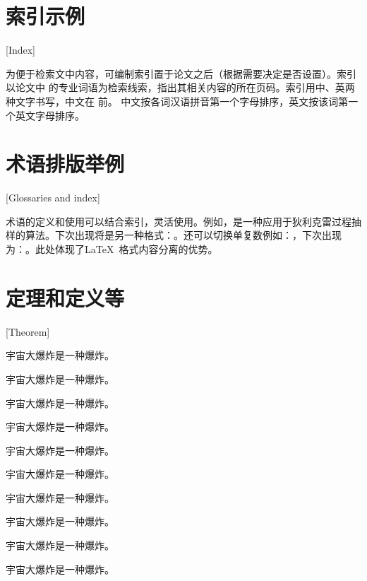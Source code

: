 \section{索引示例}[Index]

为便于检索文中内容，可编制索引置于论文之后（根据需要决定是否设置）。索引以论文中
的专业词语为检索线索，指出其相关内容的所在页码。索引用中、英两种文字书写，中文在
前。
中文按各词汉语拼音第一个字母排序，英文按该词第一个英文字母排序。

\section{术语排版举例}[Glossaries and index]

术语的定义和使用可以结合索引，灵活使用。例如，\gtssbp 是一种应用于狄利克雷过程抽样的算法。下次出现将是另一种格式：\gtssbp 。还可以切换单复数例如：\gscna ，下次出现为：\gscnas 。此处体现了\LaTeX\ 格式内容分离的优势。

\section{定理和定义等}[Theorem]

\begin{theorem}
	宇宙大爆炸是一种爆炸。
\end{theorem}
\begin{definition}[（霍金）]
	宇宙大爆炸是一种爆炸。
\end{definition}
\begin{assumption}
	宇宙大爆炸是一种爆炸。
\end{assumption}
\begin{lemma}
	宇宙大爆炸是一种爆炸。
\end{lemma}
\begin{corollary}
	宇宙大爆炸是一种爆炸。
\end{corollary}
\begin{exercise}
	宇宙大爆炸是一种爆炸。
\end{exercise}
\begin{problem}
宇宙大爆炸是一种爆炸。
\end{problem}
\begin{remark}
	宇宙大爆炸是一种爆炸。
\end{remark}
\begin{axiom}[（爱因斯坦）]
	宇宙大爆炸是一种爆炸。
\end{axiom}
\begin{conjecture}
	宇宙大爆炸是一种爆炸。
\end{conjecture}

